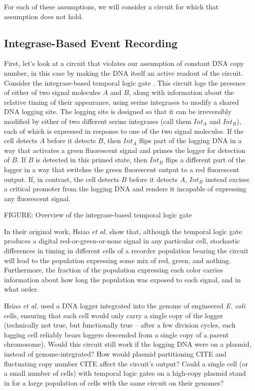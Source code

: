 \documentclass[preprint,12pt]{elsarticle}
\begin{document}
For each of these assumptions, we will consider a circuit for which that assumption does not hold. 

\subsection{Integrase-Based Event Recording}

First, let's look at a circuit that violates our assumption of constant DNA copy number, in this case by making the DNA itself an active readout of the circuit. Consider the integrase-based temporal logic gate \citep{hsiao2016}. This circuit logs the presence of either of two signal molecules $A$ and $B$, along with information about the relative timing of their appearance, using serine integrases to modify a shared DNA logging site. The logging site is designed so that it can be irreversibly modified by either of two different serine integrases (call them $Int_A$ and $Int_B$), each of which is expressed in response to one of the two signal molecules. If the cell detects $A$ before it detects $B$, then $Int_A$ flips part of the logging DNA in a way that activates a green fluorescent signal and primes the logger for detection of $B$. If $B$ is detected in this primed state, then $Int_B$ flips a different part of the logger in a way that switches the green fluorescent output to a red fluorescent output. If, in contrast, the cell detects $B$ before it detects $A$, $Int_B$ instead excises a critical promoter from the logging DNA and renders it incapable of expressing any fluorescent signal. 

\vspace{.5in}
FIGURE: Overview of the integrase-based temporal logic gate
\vspace{.5in}

In their original work, Hsiao \emph{et al.} show that, although the temporal logic gate produces a digital red-or-green-or-none signal in any particular cell, stochastic differences in timing in different cells of a recorder population bearing the circuit will lead to the population expressing some mix of red, green, and nothing. Furthermore, the fraction of the population expressing each color carries information about how long the population was exposed to each signal, and in what order. 

Hsiao \emph{et al.} used a DNA logger integrated into the genome of engineered \emph{E. coli} cells, ensuring that each cell would only carry a single copy of the logger (technically not true, but functionally true -- after a few division cycles, each logging cell reliably bears loggers descended from a single copy of a parent chromosome). Would this circuit still work if the logging DNA were on a plasmid, instead of genome-integrated? How would plasmid partitioning {CITE} and fluctuating copy number {CITE} affect the circuit's output? Could a single cell (or a small number of cells) with temporal logic gates on a high-copy plasmid stand in for a large population of cells with the same circuit on their genomes? 
\end{document}
